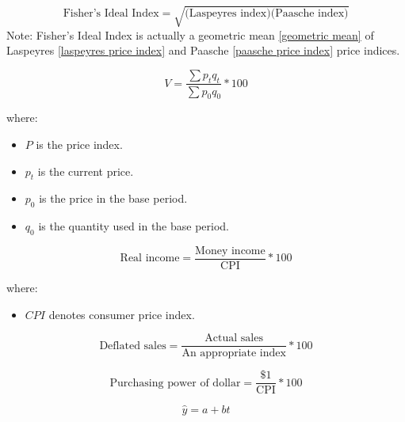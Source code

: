 \begin{equation}
\label{fisher ideal index}
\text{Fisher's Ideal Index} = \sqrt{\text{(Laspeyres index)}\text{(Paasche index)}}
\end{equation}
Note: Fisher's Ideal Index is actually a geometric mean \eqref{geometric mean} of Laspeyres \eqref{laspeyres price index} and Paasche \eqref{paasche price index} price indices.
\hformbar


\begin{equation}
\label{value index}
V = \frac{\sum p_t q_t}{\sum p_0 q_0}*100
\end{equation}

where:
\begin{itemize}
 \item $P$ is the price index.
 \item $p_t$ is the current price.
 \item $p_0$ is the price in the base period.
 \item $q_0$ is the quantity used in the base period.
\end{itemize}
\hformbar


\begin{equation}
\label{real income}
\text{Real income} = \frac{\text{Money income}}{\text{CPI}}*100
\end{equation}

where:
\begin{itemize}
 \item $CPI$ denotes consumer price index.
\end{itemize}
\hformbar


\begin{equation}
\label{index deflator}
\text{Deflated sales} = \frac{\text{Actual sales}}{\text{An appropriate index}}*100
\end{equation}
\hformbar


\begin{equation}
\label{purchasing power}
\text{Purchasing power of dollar} = \frac{\text{\$1}}{\text{CPI}}*100
\end{equation}
\hformbar



\begin{equation}
\label{linear trend equation}
\hat{y} = a + bt
\end{equation}

